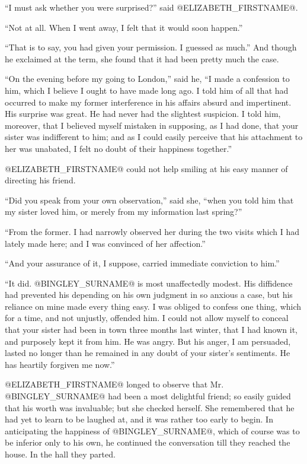 ``I must ask whether you were surprised?'' said @ELIZABETH_FIRSTNAME@.

``Not at all. When I went away, I felt that it would soon happen.''

``That is to say, you had given your permission. I guessed as much.'' And
though he exclaimed at the term, she found that it had been pretty much
the case.

``On the evening before my going to London,'' said he, ``I made a
confession to him, which I believe I ought to have made long ago. I
told him of all that had occurred to make my former interference in his
affairs absurd and impertinent. His surprise was great. He had never had
the slightest suspicion. I told him, moreover, that I believed myself
mistaken in supposing, as I had done, that your sister was indifferent
to him; and as I could easily perceive that his attachment to her was
unabated, I felt no doubt of their happiness together.''

@ELIZABETH_FIRSTNAME@ could not help smiling at his easy manner of directing his
friend.

``Did you speak from your own observation,'' said she, ``when you told him
that my sister loved him, or merely from my information last spring?''

``From the former. I had narrowly observed her during the two visits
which I had lately made here; and I was convinced of her affection.''

``And your assurance of it, I suppose, carried immediate conviction to
him.''

``It did. @BINGLEY_SURNAME@ is most unaffectedly modest. His diffidence had
prevented his depending on his own judgment in so anxious a case, but
his reliance on mine made every thing easy. I was obliged to confess
one thing, which for a time, and not unjustly, offended him. I could not
allow myself to conceal that your sister had been in town three months
last winter, that I had known it, and purposely kept it from him. He was
angry. But his anger, I am persuaded, lasted no longer than he remained
in any doubt of your sister's sentiments. He has heartily forgiven me
now.''

@ELIZABETH_FIRSTNAME@ longed to observe that Mr. @BINGLEY_SURNAME@ had been a most delightful
friend; so easily guided that his worth was invaluable; but she checked
herself. She remembered that he had yet to learn to be laughed at,
and it was rather too early to begin. In anticipating the happiness
of @BINGLEY_SURNAME@, which of course was to be inferior only to his own, he
continued the conversation till they reached the house. In the hall they
parted.



